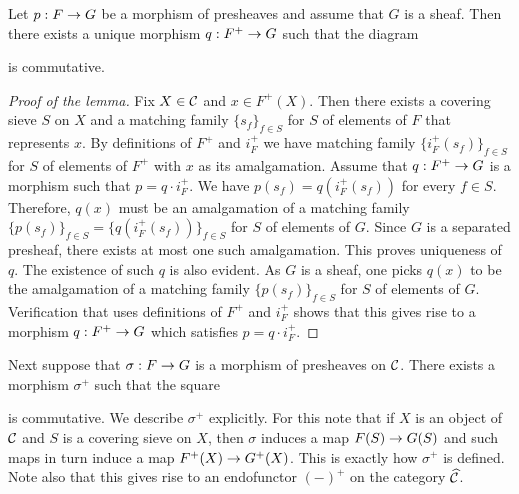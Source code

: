 \begin{lemma}\label{lemma:universalpropertyofplusconstruction}
Let $p:F\rightarrow G$ be a morphism of presheaves and assume that $G$ is a sheaf. Then there exists a unique morphism $q:F^+\rightarrow G$ such that the diagram
\begin{center}
\end{center}
is commutative.
\end{lemma}
\begin{proof}[Proof of the lemma]
Fix $X\in {\mathcal C}$ and $x\in F^+(X)$. Then there exists a covering sieve $S$ on $X$ and a matching family $\{s_f\}_{f\in S}$ for $S$ of elements of $F$ that represents $x$. By definitions of $F^+$ and $i_F^+$ we have matching family $\{i_F^+(s_f)\}_{f\in S}$ for $S$ of elements of $F^+$ with $x$ as its amalgamation.
Assume that $q:F^+\rightarrow G$ is a morphism such that $p=q\cdot i^+_F$.  We have $p(s_f)=q(i_F^+(s_f))$ for every $f\in S$. Therefore, $q(x)$ must be an amalgamation of a matching family $\{p(s_f)\}_{f\in S}=\{q(i^+_F(s_f))\}_{f\in S}$ for $S$ of elements of $G$. Since $G$ is a separated presheaf, there exists at most one such amalgamation. This proves uniqueness of $q$. The existence of such $q$ is also evident. As $G$ is a sheaf, one picks $q(x)$ to be the amalgamation of a matching family $\{p(s_f)\}_{f\in S}$ for $S$ of elements of $G$. Verification that uses definitions of $F^+$ and $i^+_F$ shows that this gives rise to a morphism $q:F^+\rightarrow G$ which satisfies $p=q\cdot i^+_F$.
\end{proof}
\noindent
Next suppose that $\sigma:F\rightarrow G$ is a morphism of presheaves on ${\mathcal C}$. There exists a morphism $\sigma^+$ such that the square
\begin{center}
\end{center}
is commutative. We describe $\sigma^+$ explicitly. For this note that if $X$ is an object of ${\mathcal C}$ and $S$ is a covering sieve on $X$, then $\sigma$ induces a map $F(S)\rightarrow G(S)$ and such maps in turn induce a map $F^+(X)\rightarrow G^+(X)$. This is exactly how $\sigma^+$ is defined. Note also that this gives rise to an endofunctor $(-)^+$ on the category $\widehat{{\mathcal C}}$.

